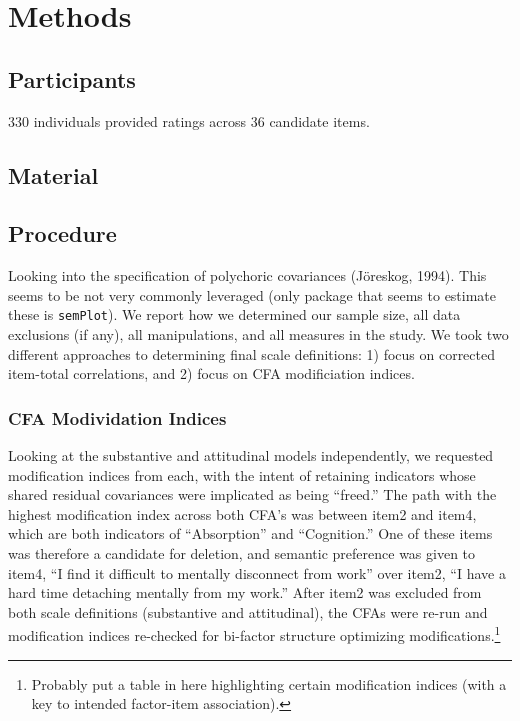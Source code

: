 \documentclass[
  english,
  man]{apa6}
\begin{document}
\hypertarget{methods}{%
\section{Methods}\label{methods}}

\hypertarget{participants}{%
\subsection{Participants}\label{participants}}

330 individuals provided ratings across 36 candidate items.

\hypertarget{material}{%
\subsection{Material}\label{material}}

\hypertarget{procedure}{%
\subsection{Procedure}\label{procedure}}

Looking into the specification of polychoric covariances (Jöreskog, 1994). This seems to be not very commonly leveraged (only package that seems to estimate these is \texttt{semPlot}). We report how we determined our sample size, all data exclusions (if any), all manipulations, and all measures in the study. We took two different approaches to determining final scale definitions: 1) focus on corrected item-total correlations, and 2) focus on CFA modificiation indices.

\hypertarget{cfa-modividation-indices}{%
\subsubsection{CFA Modividation Indices}\label{cfa-modividation-indices}}

Looking at the substantive and attitudinal models independently, we requested modification indices from each, with the intent of retaining indicators whose shared residual covariances were implicated as being ``freed.'' The path with the highest modification index across both CFA's was between item2 and item4, which are both indicators of ``Absorption'' and ``Cognition.'' One of these items was therefore a candidate for deletion, and semantic preference was given to item4, ``I find it difficult to mentally disconnect from work'' over item2, ``I have a hard time detaching mentally from my work.'' After item2 was excluded from both scale definitions (substantive and attitudinal), the CFAs were re-run and modification indices re-checked for bi-factor structure optimizing modifications.\footnote{Probably put a table in here highlighting certain modification indices (with a key to intended factor-item association).}
\end{document}
